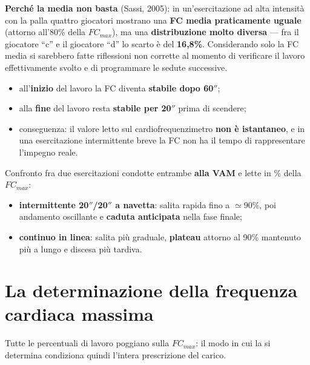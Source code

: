 \textbf{Perché la media non basta} (Sassi, 2005): in un'esercitazione ad alta intensità con la palla
quattro giocatori mostrano una \textbf{FC media praticamente uguale} (attorno all'80\% della
$FC_{max}$), ma una \textbf{distribuzione molto diversa} --- fra il giocatore ``c'' e il giocatore
``d'' lo scarto è del \textbf{16,8\%}. Considerando solo la FC media si sarebbero fatte riflessioni
non corrette al momento di verificare il lavoro effettivamente svolto e di programmare le sedute
successive.

\begin{itemize}
  \item all'\textbf{inizio} del lavoro la FC diventa \textbf{stabile dopo 60$''$};
  \item alla \textbf{fine} del lavoro resta \textbf{stabile per 20$''$} prima di scendere;
  \item conseguenza: il valore letto sul cardiofrequenzimetro \textbf{non è istantaneo}, e in una
    esercitazione intermittente breve la FC non ha il tempo di rappresentare l'impegno reale.
\end{itemize}

Confronto fra due esercitazioni condotte entrambe \textbf{alla VAM} e lette in \% della $FC_{max}$:
\begin{itemize}
  \item \textbf{intermittente 20$''$/20$''$ a navetta}: salita rapida fino a $\simeq 90\%$, poi
    andamento oscillante e \textbf{caduta anticipata} nella fase finale;
  \item \textbf{continuo in linea}: salita più graduale, \textbf{plateau} attorno al 90\% mantenuto
    più a lungo e discesa più tardiva.
\end{itemize}

\section{La determinazione della frequenza cardiaca massima}

Tutte le percentuali di lavoro poggiano sulla $FC_{max}$: il modo in cui la si determina condiziona
quindi l'intera prescrizione del carico.

